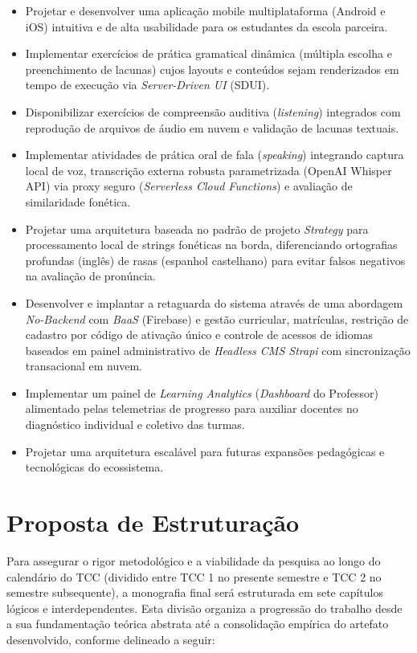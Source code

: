 \documentclass[portuguese]{sbcreviews-2025}%
\begin{document}
\begin{itemize}
    \item Projetar e desenvolver uma aplicação mobile multiplataforma (Android e iOS) intuitiva e de alta usabilidade para os estudantes da escola parceira.
    \item Implementar exercícios de prática gramatical dinâmica (múltipla escolha e preenchimento de lacunas) cujos layouts e conteúdos sejam renderizados em tempo de execução via \textit{Server-Driven UI} (SDUI).
    \item Disponibilizar exercícios de compreensão auditiva (\textit{listening}) integrados com reprodução de arquivos de áudio em nuvem e validação de lacunas textuais.
    \item Implementar atividades de prática oral de fala (\textit{speaking}) integrando captura local de voz, transcrição externa robusta parametrizada (OpenAI Whisper API) via proxy seguro (\textit{Serverless Cloud Functions}) e avaliação de similaridade fonética.
    \item Projetar uma arquitetura baseada no padrão de projeto \textit{Strategy} para processamento local de strings fonéticas na borda, diferenciando ortografias profundas (inglês) de rasas (espanhol castelhano) para evitar falsos negativos na avaliação de pronúncia.
    \item Desenvolver e implantar a retaguarda do sistema através de uma abordagem \textit{No-Backend} com \textit{BaaS} (Firebase) e gestão curricular, matrículas, restrição de cadastro por código de ativação único e controle de acessos de idiomas baseados em painel administrativo de \textit{Headless CMS Strapi} com sincronização transacional em nuvem.
    \item Implementar um painel de \textit{Learning Analytics} (\textit{Dashboard} do Professor) alimentado pelas telemetrias de progresso para auxiliar docentes no diagnóstico individual e coletivo das turmas.
    \item Projetar uma arquitetura escalável para futuras expansões pedagógicas e tecnológicas do ecossistema.
\end{itemize}

\section{Proposta de Estruturação}

Para assegurar o rigor metodológico e a viabilidade da pesquisa ao longo do calendário do TCC (dividido entre TCC 1 no presente semestre e TCC 2 no semestre subsequente), a monografia final será estruturada em sete capítulos lógicos e interdependentes. Esta divisão organiza a progressão do trabalho desde a sua fundamentação teórica abstrata até a consolidação empírica do artefato desenvolvido, conforme delineado a seguir:
\end{document}

